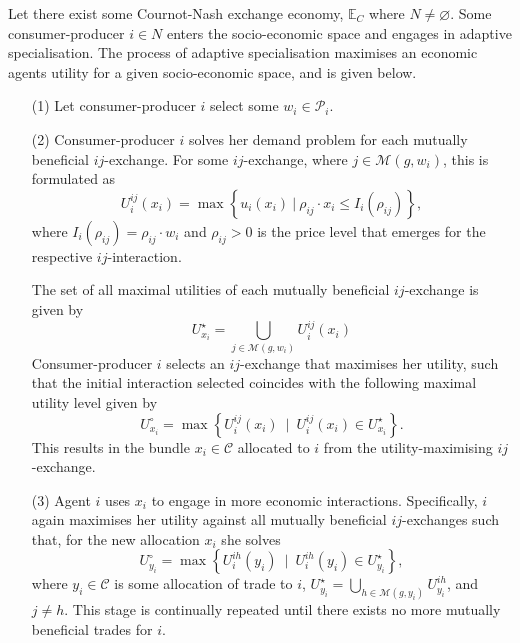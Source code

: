\begin{algorithm}
Let there exist some Cournot-Nash exchange economy, $\mathbb{E}_{C}$ where $N \neq \varnothing$. Some consumer-producer $i \in N$ enters the socio-economic space and engages in adaptive specialisation. The process of adaptive specialisation maximises an economic agents utility for a given socio-economic space, and is given below.

\begin{itemize}
	\item[(1)] Let consumer-producer $i$ select some $w_{i} \in \mathcal{P}_{i}$.

	\item[(2)] Consumer-producer $i$ solves her demand problem for each mutually beneficial $ij$-exchange. For some $ij$-exchange, where $j \in \mathcal{M}(g,w_{i})$, this is formulated as
	    \begin{equation}
	    U^{ij}_{i}(x_{i}) = \max \left\{ u_{i}(x_{i}) ~ | ~ \rho_{ij} \cdot x_{i} \leqslant I_{i}(\rho_{ij}) \right\} ,
	    \end{equation}
	    where $I_{i}(\rho_{ij}) = \rho_{ij} \cdot w_{i}$ and $\rho_{ij} > 0$ is the price level that emerges for the respective $ij$-interaction.

	    The set of all maximal utilities of each mutually beneficial $ij$-exchange is given by
	    \begin{equation}
	    U^{\star}_{x_i} = \bigcup_{j \in \mathcal{M}(g,w_{i})} U^{ij}_{i}(x_{i})
	    \end{equation}
	    Consumer-producer $i$ selects an $ij$-exchange that maximises her utility, such that the initial interaction selected coincides with the following maximal utility level given by
	    \begin{equation}
	    U^{\circ}_{x_i} = \max \left\{ U^{ij}_{i}(x_{i}) ~ \mid ~ U^{ij}_{i}(x_{i}) \in U^{\star}_{x_i} \right\} .
	    \end{equation}
	    This results in the bundle $x_{i} \in \mathcal{C}$ allocated to $i$ from the utility-maximising $ij$-exchange.

	\item[(3)] Agent $i$ uses $x_{i}$ to engage in more economic interactions. Specifically, $i$ again maximises her utility against all mutually beneficial $ij$-exchanges such that, for the new allocation $x_{i}$ she solves
	    \begin{equation}
	    U^{\circ}_{y_i} = \max \left\{ U^{ih}_{i}(y_{i}) ~ \mid ~ U^{ih}_{i}(y_{i}) \in U^{\star}_{y_i} \right\} ,
	    \end{equation}
	    where $y_{i} \in \mathcal{C}$ is some allocation of trade to $i$, $U^{\star}_{y_i} = \bigcup_{h \in \mathcal{M}(g,y_{i})} U^{ih}_{y_i}$, and $j \neq h$. This stage is continually repeated until there exists no more mutually beneficial trades for $i$.


\end{itemize}
\end{algorithm}

